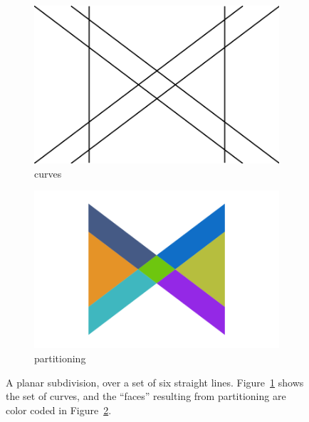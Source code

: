 \begin{figure}%
  \centering
  \begin{subfigure}{.4\textwidth}
    \includegraphics[width=\textwidth]{figures/intro_curves1.png}
    \caption{curves} \label{subfig:intro_curves1}
  \end{subfigure}%
  \quad \quad \quad%
  \begin{subfigure}{.4\textwidth}
    \includegraphics[width=\textwidth]{figures/intro_partitioning1.png}
    \caption{partitioning} \label{subfig:intro_partitioning1}
  \end{subfigure}%
  \caption[xxx]
          {A planar subdivision, over a set of six straight lines.
          Figure~\ref{subfig:intro_curves1} shows the set of curves, and the ``faces'' resulting from partitioning are color coded in Figure~\ref{subfig:intro_partitioning1}.}
  \label{fig:intro_curvesPartitioning1}
\end{figure}

